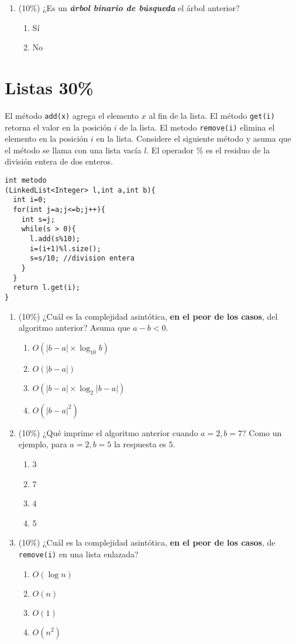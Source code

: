 \documentclass[10 pt]{article}
\begin{document}
\begin{multicols}{2}
\begin{enumerate}[label=\alph*]
\item (10\%) ¿Es un \textbf{\textit{árbol binario de búsqueda}} el árbol anterior?
\begin{enumerate}[label=(\roman*)]
\item Sí
\item No
\end{enumerate}
\end{enumerate}
\section{Listas 30\%}
El método \texttt{add(x)} agrega el elemento $x$ al fin de la lista. El método \texttt{get(i)} retorna el valor en la posición $i$ de la lista. El metodo \texttt{remove(i)} elimina el elemento en la posición $i$ en la lista. Considere el siguiente método y asuma que el método se llama con una lista vacía $l$. El operador \% es el residuo de la división entera de dos enteros.
\begin{lstlisting}
int metodo
(LinkedList<Integer> l,int a,int b){
  int i=0;
  for(int j=a;j<=b;j++){
    int s=j;
    while(s > 0){
      l.add(s%10);
      i=(i+1)%l.size(); 
      s=s/10; //division entera
    }
  }
  return l.get(i);
}
\end{lstlisting}
\begin{enumerate}[label=\alph*]
\item (10\%) ¿Cuál es la complejidad asintótica, \textbf{en el peor de los casos}, del algoritmo anterior? Asuma que $a-b<0$.
\begin{enumerate}[label=(\roman*)]
\item $O(|b-a|\times \log_{10} b)$
\item $O(|b-a|)$
\item $O(|b-a|\times \log_2 |b-a|)$
\item $O(|b-a|^2)$
\end{enumerate}
\item (10\%) ¿Qué imprime el algoritmo anterior cuando $a=2,b=7$? Como un ejemplo, para $a=2, b=5$ la respuesta es $5$. 
\begin{enumerate}[label=(\roman*)]
\item 3
\item 7
\item 4
\item 5
\end{enumerate}
\item (10\%) ¿Cuál es la complejidad asintótica, \textbf{en el peor de los casos}, de \texttt{remove(i)} en una lista enlazada?
\begin{enumerate}[label=(\roman*)]
\item $O(\log n)$
\item $O(n)$
\item $O(1)$
\item $O(n^2)$
\end{enumerate}
\end{enumerate}

\end{multicols}
\end{document}
